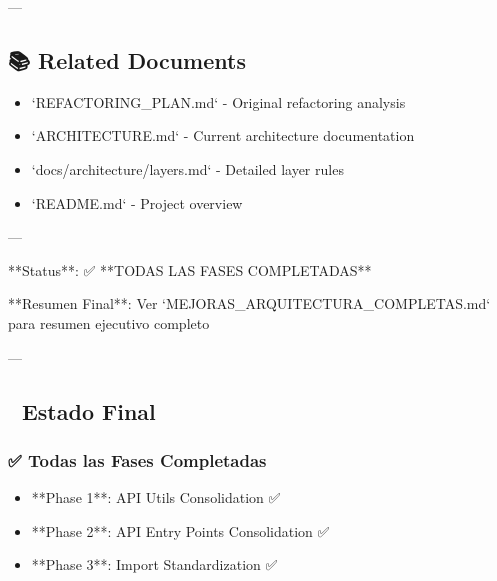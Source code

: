 \documentclass[11pt,a4paper]{article}
\begin{document}
---

\subsection{📚 Related Documents}

\begin{itemize}
\item `REFACTORING_PLAN.md` - Original refactoring analysis
\end{itemize}

\begin{itemize}
\item `ARCHITECTURE.md` - Current architecture documentation
\end{itemize}

\begin{itemize}
\item `docs/architecture/layers.md` - Detailed layer rules
\end{itemize}

\begin{itemize}
\item `README.md` - Project overview
\end{itemize}

---

**Status**: ✅ **TODAS LAS FASES COMPLETADAS**  

**Resumen Final**: Ver `MEJORAS\_ARQUITECTURA\_COMPLETAS.md` para resumen ejecutivo completo

---

\subsection{🎉 Estado Final}

\subsubsection{✅ Todas las Fases Completadas}

\begin{itemize}
\item [x] **Phase 1**: API Utils Consolidation ✅
\end{itemize}

\begin{itemize}
\item [x] **Phase 2**: API Entry Points Consolidation ✅
\end{itemize}

\begin{itemize}
\item [x] **Phase 3**: Import Standardization ✅
\end{itemize}
\end{document}
